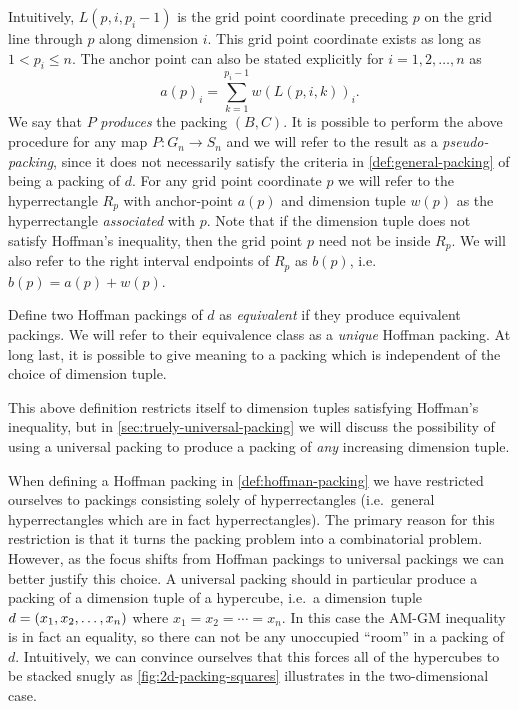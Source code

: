 \noindent Intuitively, $L(p, i, p_i - 1)$ is the grid point coordinate preceding $p$ on the grid line through $p$ along dimension $i$. This grid point coordinate exists as long as $1 < p_i \leq n$. The anchor point can also be stated explicitly for $i = 1, 2, \dotsc, n$ as
\[
a(p)_i = \sum_{k = 1}^{p_i - 1} w(L(p, i, k))_i.
\]
We say that $P$ \textit{produces} the packing $(B, C)$. It is possible to perform the above procedure for any map $P \colon G_n \to S_n$ and we will refer to the result as a \textit{pseudo-packing}, since it does not necessarily satisfy the criteria in \cref{def:general-packing} of being a packing of $d$. For any grid point coordinate $p$ we will refer to the hyperrectangle $R_p$ with anchor-point $a(p)$ and dimension tuple $w(p)$ as the hyperrectangle \textit{associated} with $p$. Note that if the dimension tuple does not satisfy Hoffman's inequality, then the grid point $p$ need not be inside $R_p$. We will also refer to the right interval endpoints of $R_p$ as $b(p)$, i.e.\ $b(p) = a(p) + w(p)$.

Define two Hoffman packings of $d$ as \textit{equivalent} if they produce equivalent packings. We will refer to their equivalence class as a \textit{unique} Hoffman packing. At long last, it is possible to give meaning to a packing which is independent of the choice of dimension tuple.


\noindent This above definition restricts itself to dimension tuples satisfying Hoffman's inequality, but in \cref{sec:truely-universal-packing} we will discuss the possibility of using a universal packing to produce a packing of \textit{any} increasing dimension tuple.

\begin{remark}
When defining a Hoffman packing in \cref{def:hoffman-packing} we have restricted ourselves to packings consisting solely of hyperrectangles (i.e.\ general hyperrectangles which are in fact hyperrectangles). The primary reason for this restriction is that it turns the packing problem into a combinatorial problem. However, as the focus shifts from Hoffman packings to universal packings we can better justify this choice. A universal packing should in particular produce a packing of a dimension tuple of a hypercube, i.e.\ a dimension tuple $d = \left( x_1, x_2, \dotsc, x_n \right)$ where $x_1 = x_2 = \dotsb = x_n$. In this case the AM-GM inequality is in fact an equality, so there can not be any unoccupied ``room'' in a packing of $d$. Intuitively, we can convince ourselves that this forces all of the hypercubes to be stacked snugly as \cref{fig:2d-packing-squares} illustrates in the two-dimensional case.
\end{remark}

